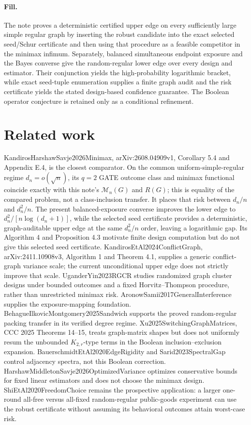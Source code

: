 \documentclass{article}
\begin{document}
\paragraph{Fill.} The note proves a deterministic certified upper edge on every sufficiently large simple regular graph by inserting the robust candidate into the exact selected seed/Schur certificate and then using that procedure as a feasible competitor in the minimax infimum. Separately, balanced simultaneous endpoint exposure and the Bayes converse give the random-regular lower edge over every design and estimator. Their conjunction yields the high-probability logarithmic bracket, while exact seed-tuple enumeration supplies a finite graph audit and the risk certificate yields the stated design-based confidence guarantee. The Boolean operator conjecture is retained only as a conditional refinement.

\section{Related work}

KandirosHarshawSavje2026Minimax, arXiv:2608.04909v1, Corollary 5.4 and Appendix E.4, is the closest comparator. On the common uniform-simple-regular regime \(d_n=o(\sqrt n)\), its \(q=2\) GATE outcome class and minimax functional coincide exactly with this note's \(\mathcal M_n(G)\) and \(R(G)\); this is equality of the compared problem, not a class-inclusion transfer. It places that risk between \(d_n/n\) and \(d_n^2/n\). The present balanced-exposure converse improves the lower edge to \(d_n^2/[n\log(d_n+1)]\), while the selected seed certificate provides a deterministic, graph-auditable upper edge at the same \(d_n^2/n\) order, leaving a logarithmic gap. Its Algorithm 4 and Proposition 4.3 motivate finite design computation but do not give this selected seed certificate. KandirosEtAl2024ConflictGraph, arXiv:2411.10908v3, Algorithm 1 and Theorem 4.1, supplies a generic conflict-graph variance scale; the current unconditional upper edge does not strictly improve that scale. UganderYin2023RGCR studies randomized graph cluster designs under bounded outcomes and a fixed Horvitz--Thompson procedure, rather than unrestricted minimax risk. AronowSamii2017GeneralInterference supplies the exposure-mapping foundation. BehagueIlkovicMontgomery2025Sandwich supports the proved random-regular packing transfer in its verified degree regime. Xu2025SwitchingGraphMatrices, CCC 2025 Theorems 14--15, treats graph-matrix shapes but does not uniformly resum the unbounded \(K_{2,r}\)-type terms in the Boolean inclusion--exclusion expansion. BauerschmidtEtAl2020EdgeRigidity and Sarid2023SpectralGap control adjacency spectra, not this Boolean correction. HarshawMiddletonSavje2026OptimizedVariance optimizes conservative bounds for fixed linear estimators and does not choose the minimax design. ShiEtAl2020FreedomChoice remains the prospective application: a larger one-round all-free versus all-fixed random-regular public-goods experiment can use the robust certificate without assuming its behavioral outcomes attain worst-case risk.
\end{document}

